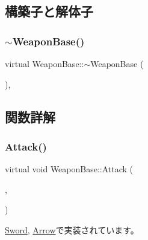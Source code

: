 \subsection{構築子と解体子}
\mbox{\label{class_weapon_base_a311bee6c8496581f21068867be48762f}} 
\subsubsection{\texorpdfstring{$\sim$\+Weapon\+Base()}{~WeaponBase()}}
{\footnotesize\ttfamily virtual Weapon\+Base\+::$\sim$\+Weapon\+Base (\begin{DoxyParamCaption}{ }\end{DoxyParamCaption})\hspace{0.3cm}{\ttfamily [inline]}, {\ttfamily [virtual]}}



\subsection{関数詳解}
\mbox{\label{class_weapon_base_a8663cb6d8510d5b3aff1129c575cbd9c}} 
\subsubsection{\texorpdfstring{Attack()}{Attack()}}
{\footnotesize\ttfamily virtual void Weapon\+Base\+::\+Attack (\begin{DoxyParamCaption}\item[{bool}]{,  }\item[{const \mbox{\hyperlink{common_8h_afb0c5e21d4133ff4f200992c0b534e1b}{V\+E\+C2}} \&}]{ }\end{DoxyParamCaption})\hspace{0.3cm}{\ttfamily [pure virtual]}}



\mbox{\hyperlink{class_sword_a923943b87ee19f3670bfcdb18d670e1e}{Sword}}, \mbox{\hyperlink{class_arrow_ab2571579c0183f4db62bc1c4f9fc68f3}{Arrow}}で実装されています。

\mbox{\label{class_weapon_base_a417784a8c8bf73cd398a77b922fc110c}} 
